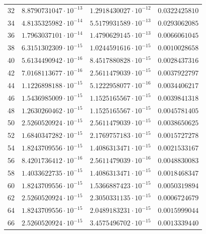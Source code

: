 \documentclass{article}
\begin{document}
\begin{table}[htb]
\begin{tabular}{|l|l|l|l|}
      32  & $8.8790731047 \cdot 10^{-13}$ & $1.2918430027 \cdot 10^{-12}$ & $0.0322425810$               \\
      34  & $4.8135325982 \cdot 10^{-14}$ & $5.5179931589 \cdot 10^{-13}$ & $0.0293062085$               \\
      36  & $1.7963037101 \cdot 10^{-14}$ & $1.4790629145 \cdot 10^{-13}$ & $0.0066061045$               \\
      38  & $6.3151302309 \cdot 10^{-15}$ & $1.0244591616 \cdot 10^{-15}$ & $0.0010028658$               \\
      40  & $5.6134490942 \cdot 10^{-16}$ & $8.4517880828 \cdot 10^{-15}$ & $0.0028437316$               \\
      42  & $7.0168113677 \cdot 10^{-16}$ & $2.5611479039 \cdot 10^{-15}$ & $0.0037922797$               \\
      44  & $1.1226898188 \cdot 10^{-15}$ & $5.1222958077 \cdot 10^{-16}$ & $0.0034406217$               \\
      46  & $1.5436985009 \cdot 10^{-15}$ & $1.1525165567 \cdot 10^{-15}$ & $0.0039841318$               \\
      48  & $1.2630260462 \cdot 10^{-15}$ & $1.1525165567 \cdot 10^{-15}$ & $0.0045781405$               \\
      50  & $2.5260520924 \cdot 10^{-15}$ & $2.5611479039 \cdot 10^{-15}$ & $0.0038650625$               \\
      52  & $1.6840347282 \cdot 10^{-15}$ & $2.1769757183 \cdot 10^{-15}$ & $0.0015727278$               \\
      54  & $1.8243709556 \cdot 10^{-15}$ & $1.4086313471 \cdot 10^{-15}$ & $0.0021533167$               \\
      56  & $8.4201736412 \cdot 10^{-16}$ & $2.5611479039 \cdot 10^{-16}$ & $0.0048830083$               \\
      58  & $1.4033622735 \cdot 10^{-15}$ & $1.4086313471 \cdot 10^{-15}$ & $0.0018468347$               \\
      60  & $1.8243709556 \cdot 10^{-15}$ & $1.5366887423 \cdot 10^{-15}$ & $0.0050319894$               \\
      62  & $2.5260520924 \cdot 10^{-15}$ & $2.3050331135 \cdot 10^{-15}$ & $0.0006724679$               \\
      64  & $1.8243709556 \cdot 10^{-15}$ & $2.0489183231 \cdot 10^{-15}$ & $0.0015999044$               \\
      66  & $2.5260520924 \cdot 10^{-15}$ & $3.4575496702 \cdot 10^{-15}$ & $0.0013339440$               \\

\end{tabular}
\end{table}
\end{document}
